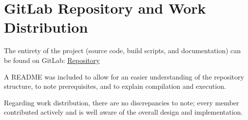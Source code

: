 \documentclass[12pt,a4paper]{article}
\begin{document}
\section{GitLab Repository and Work Distribution}
\label{sec:git}

The entirety of the project (source code, build scripts, and documentation)
can be found on GitLab:
\href{https://gitlab.up.pt/classes/cpd/2526/t07/g13/-/tree/main/assign2?ref_type=heads}{Repository}

A README was included to allow for an easier understanding of the repository
structure, to note prerequisites, and to explain compilation and execution.

Regarding work distribution, there are no discrepancies to note; every member
contributed actively and is well aware of the overall design and
implementation.
\end{document}

